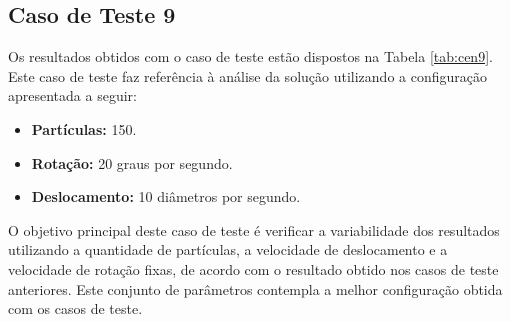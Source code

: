 \subsection{Caso de Teste 9}
\label{sub:cen9}

Os resultados obtidos com o caso de teste estão dispostos na Tabela \ref{tab:cen9}. Este caso de teste faz referência à análise da solução
utilizando a configuração apresentada a seguir:

\begin{itemize}
  \item \textbf{Partículas:} 150.
  \item \textbf{Rotação:} 20 graus por segundo.
  \item \textbf{Deslocamento:} 10 diâmetros por segundo.
\end{itemize}

O objetivo principal deste caso de teste é verificar a variabilidade dos resultados utilizando a quantidade de partículas, a velocidade de
deslocamento e a velocidade de rotação fixas, de acordo com o resultado obtido nos casos de teste anteriores. Este conjunto de parâmetros
contempla a melhor configuração obtida com os casos de teste.

